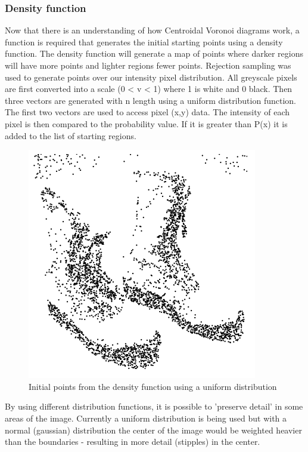 \subsubsection{Density function}
Now that there is an understanding of how Centroidal Voronoi diagrams work, a function is required that generates the initial starting points using a density function. The density function will generate a map of points where darker regions will have more points and lighter regions fewer points. Rejection sampling was used to generate points over our intensity pixel distribution. All greyscale pixels are first converted into a scale (0 < v < 1) where 1 is white and 0 black. Then three vectors are generated with n length using a uniform distribution function. The first two vectors are used to access pixel (x,y) data. The intensity of each pixel is then compared to the probability value. If it is greater than P(x) it is added to the list of starting regions. 

\begin{figure}[!htb]
\centerline{\includegraphics{images/uniform_distribution_shoes.png}}
\caption{Initial points from the density function using a uniform distribution\newline}
\label{figPlaneP}
\end{figure}

By using  different distribution functions, it is possible to 'preserve detail' in some areas of the image. Currently a uniform distribution is being used but with a normal (gaussian) distribution the center of the image would be weighted heavier than the boundaries - resulting in more detail (stipples) in the center.

